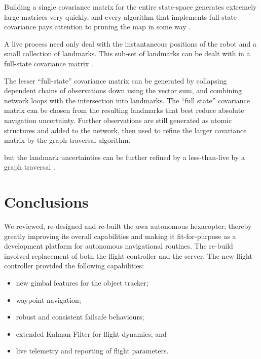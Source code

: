 \documentclass[a4paper, 11pt, titlepage]{article}
\begin{document}
        Building a single covariance matrix for the entire state-space generates extremely large matrices very quickly, and every algorithm that implements full-state covariance pays attention to pruning the map in some way\cite{monoslam} \cite{airshipSLAM}.
        
        A live process need only deal with the instantaneous positions of the robot and a small collection of landmarks. This sub-set of landmarks can be dealt with in a full-state covariance matrix \cite{monoslam}.  
        
        The lesser ``full-state'' covariance matrix can be generated by collapsing dependent chains of observations down using the vector sum, and combining network loops with the intersection into landmarks.  The ``full state'' covariance matrix can be chosen from the resulting landmarks that best reduce absolute navigation uncertainty.  Further observations are still generated as atomic structures and added to the network, then used to refine the larger covariance matrix by the graph traversal algorithm.  

        but the landmark uncertainties can be further refined by a less-than-live by a graph traversal \cite{SLAMgraph}.





\section{Conclusions}

We reviewed, re-designed and re-built the \gls{uwa} autonomous hexacopter; thereby greatly improving its overall capabilities and making it fit-for-purpose as a development platform for autonomous navigational routines. The re-build involved replacement of both the flight controller and the server. The new flight controller provided the following capabilities:
\begin{itemize}
  \item new gimbal features for the object tracker;
  \item waypoint navigation;
  \item robust and consistent failsafe behaviours;
  \item extended Kalman Filter for flight dynamics; and
  \item live telemetry and reporting of flight parameters.
\end{itemize}
\end{document}
